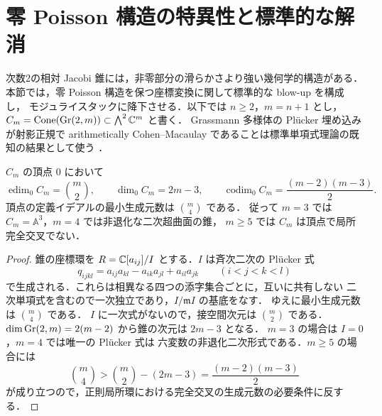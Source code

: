 \section{零 Poisson 構造の特異性と標準的な解消}
\label{sec:singularities}

次数2の相対 Jacobi 錐には，非零部分の滑らかさより強い幾何学的構造がある．
本節では，零 Poisson 構造を保つ座標変換に関して標準的な blow-up を構成し，
モジュライスタックに降下させる．以下では $n\geq2$，$m=n+1$ とし，
$C_m=\operatorname{Cone}(\operatorname{Gr}(2,m))\subset\bigwedge^2\mathbb C^m$ と書く．
Grassmann 多様体の Pl\"ucker 埋め込みが射影正規で arithmetically
Cohen--Macaulay であることは標準単項式理論の既知の結果として使う
\cite{Svanes1973,DeConciniProcesi1981}．

\begin{lemma}
\label{lemma:cone-lci}
$C_m$ の頂点 $0$ において
\[
 \operatorname{edim}_0 C_m=\binom m2,\qquad
 \dim_0 C_m=2m-3,\qquad
 \operatorname{codim}_0 C_m=\frac{(m-2)(m-3)}2.
\]
頂点の定義イデアルの最小生成元数は $\binom m4$ である．
従って $m=3$ では $C_m=\mathbb A^3$，$m=4$ では非退化な二次超曲面の錐，
$m\geq5$ では $C_m$ は頂点で局所完全交叉でない．
\end{lemma}
\begin{proof}
錐の座標環を $R=\mathbb C[a_{ij}]/I$ とする．$I$ は斉次二次の Pl\"ucker 式
\[
 q_{ijkl}=a_{ij}a_{kl}-a_{ik}a_{jl}+a_{il}a_{jk}
 \qquad (i<j<k<l)
\]
で生成される．これらは相異なる四つの添字集合ごとに，互いに共有しない
二次単項式を含むので一次独立であり，$I/\mathfrak m I$ の基底をなす．
ゆえに最小生成元数は $\binom m4$ である．
$I$ に一次式がないので，接空間次元は $\binom m2$ である．
$\dim\operatorname{Gr}(2,m)=2(m-2)$ から錐の次元は $2m-3$ となる．
$m=3$ の場合は $I=0$，$m=4$ では唯一の Pl\"ucker 式は
六変数の非退化二次形式である．$m\geq5$ の場合には
\[
 \binom m4>\binom m2-(2m-3)
 =\frac{(m-2)(m-3)}2
\]
が成り立つので，正則局所環における完全交叉の生成元数の必要条件に反する．
\end{proof}

